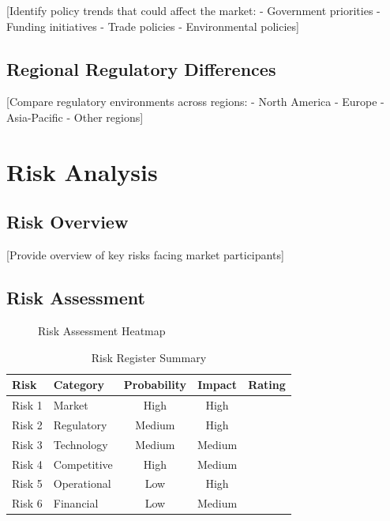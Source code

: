 \documentclass[11pt,letterpaper]{report}
\begin{document}
[Identify policy trends that could affect the market:
- Government priorities
- Funding initiatives
- Trade policies
- Environmental policies]

\section{Regional Regulatory Differences}

[Compare regulatory environments across regions:
- North America
- Europe
- Asia-Pacific
- Other regions]

\chapter{Risk Analysis}

\section{Risk Overview}

[Provide overview of key risks facing market participants]

\section{Risk Assessment}


\begin{figure}[htbp]
\centering
\caption{Risk Assessment Heatmap}
\label{fig:risk_heatmap}
\end{figure}

\begin{table}[htbp]
\centering
\caption{Risk Register Summary}
\begin{tabular}{@{}llccl@{}}
\toprule
\textbf{Risk} & \textbf{Category} & \textbf{Probability} & \textbf{Impact} & \textbf{Rating} \\
\midrule
Risk 1 & Market & High & High & \riskhigh{} \\
\rowcolor{tablealt} Risk 2 & Regulatory & Medium & High & \riskhigh{} \\
Risk 3 & Technology & Medium & Medium & \riskmedium{} \\
\rowcolor{tablealt} Risk 4 & Competitive & High & Medium & \riskmedium{} \\
Risk 5 & Operational & Low & High & \riskmedium{} \\
\rowcolor{tablealt} Risk 6 & Financial & Low & Medium & \risklow{} \\
\bottomrule
\end{tabular}
\label{tab:risk_register}
\end{table}
\end{document}
